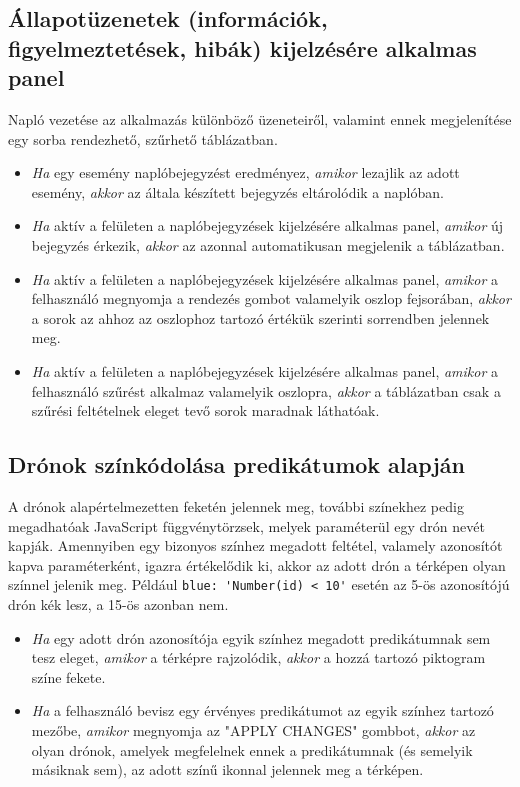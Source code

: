 \subsection{Állapotüzenetek (információk, figyelmeztetések, hibák) kijelzésére alkalmas panel}

Napló vezetése az alkalmazás különböző üzeneteiről, valamint ennek megjelenítése egy sorba rendezhető, szűrhető táblázatban.

\begin {itemize}
  \item \textit{Ha} egy esemény naplóbejegyzést eredményez, \textit{amikor} lezajlik az adott esemény, \textit{akkor} az általa készített bejegyzés eltárolódik a naplóban.
  \item \textit{Ha} aktív a felületen a naplóbejegyzések kijelzésére alkalmas panel, \textit{amikor} új bejegyzés érkezik, \textit{akkor} az azonnal automatikusan megjelenik a táblázatban.
  \item \textit{Ha} aktív a felületen a naplóbejegyzések kijelzésére alkalmas panel, \textit{amikor} a felhasználó megnyomja a rendezés gombot valamelyik oszlop fejsorában, \textit{akkor} a sorok az ahhoz az oszlophoz tartozó értékük szerinti sorrendben jelennek meg.
  \item \textit{Ha} aktív a felületen a naplóbejegyzések kijelzésére alkalmas panel, \textit{amikor} a felhasználó szűrést alkalmaz valamelyik oszlopra, \textit{akkor} a táblázatban csak a szűrési feltételnek eleget tevő sorok maradnak láthatóak.
\end {itemize}


\subsection{Drónok színkódolása predikátumok alapján}

A drónok alapértelmezetten feketén jelennek meg, további színekhez pedig megadhatóak JavaScript függvénytörzsek, melyek paraméterül egy drón nevét kapják.
Amennyiben egy bizonyos színhez megadott feltétel, valamely azonosítót kapva paraméterként, igazra értékelődik ki, akkor az adott drón a térképen olyan színnel jelenik meg.
Például \verb|blue: 'Number(id) < 10'| esetén az 5-ös azonosítójú drón kék lesz, a 15-ös azonban nem.

\begin {itemize}
  \item \textit{Ha} egy adott drón azonosítója egyik színhez megadott predikátumnak sem tesz eleget, \textit{amikor} a térképre rajzolódik, \textit{akkor} a hozzá tartozó piktogram színe fekete.
  \item \textit{Ha} a felhasználó bevisz egy érvényes predikátumot az egyik színhez tartozó mezőbe, \textit{amikor} megnyomja az "APPLY CHANGES" gombbot, \textit{akkor} az olyan drónok, amelyek megfelelnek ennek a predikátumnak (és semelyik másiknak sem), az adott színű ikonnal jelennek meg a térképen.
\end {itemize}


